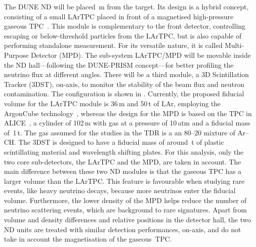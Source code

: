 The DUNE ND will be placed \,m from the target.
Its design is a hybrid concept, consisting of a small LArTPC placed in front of a magnetised high-pressure gaseous TPC~\cite{Abi:2020wmh}.
This module is complementary to the front detector, controlling escaping or below-threshold particles from the LArTPC, %
but is also capable of performing standalone measurement.
For its versatile nature, it is called Multi-Purpose Detector (MPD).
The sub-system LArTPC/MPD will be movable inside the ND hall---following the DUNE-PRISM concept---for %
better profiling the neutrino flux at different angles.
There will be a third module, a 3D Scintillation Tracker (3DST), on-axis, to monitor %
the stability of the beam flux and neutron contamination.
The configuration is shown in .
Currently, the proposed fiducial volume for the LArTPC module is 36\,m and 50\,t of LAr, %
employing the ArgonCube technology~\cite{Asaadi:2018xfh}, %
whereas the design for the MPD is based on the TPC in \mbox{ALICE}~\cite{Glassel:2004jv}, %
a cylinder of 102\,m with gas at a pressure of 10\,atm and a fiducial mass of~1\,t.
The gas assumed for the studies in the TDR is a an 80--20 mixture of Ar--CH.
The 3DST is designed to have a fiducial mass of around \,t of plastic scintillating material and %
wavelength shifting plates.
For this analysis, only the two core sub-detectors, the LArTPC and the MPD, are taken in account.
The main difference between these two ND modules is that the gaseous TPC has a larger volume than the LArTPC.
This feature is favourable when studying rare events, like heavy neutrino decays, because more neutrinos enter the fiducial volume.
Furthermore, the lower density of the MPD helps reduce the number of neutrino scattering events, which are background to rare signatures.
Apart from volume and density differences and relative positions in the detector hall, %
the two ND units are treated with similar detection performances, on-axis, and do not take in account the magnetisation of the gaseous~TPC. 

